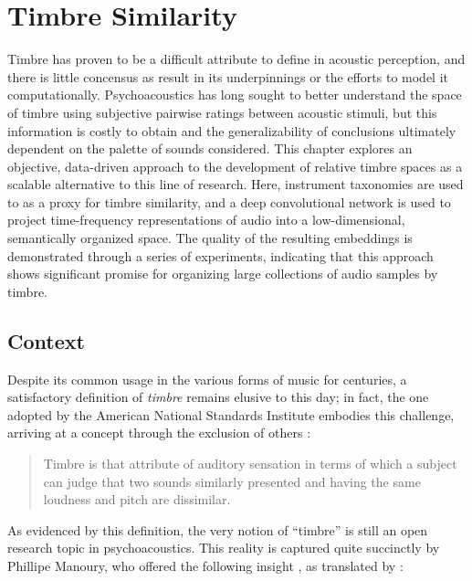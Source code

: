 
\graphicspath{{4/figures/}}

\chapter{Timbre Similarity}
\label{chp:timbre}

Timbre has proven to be a difficult attribute to define in acoustic perception, and there is little concensus as result in its underpinnings or the efforts to model it computationally.
Psychoacoustics has long sought to better understand the space of timbre using subjective pairwise ratings between acoustic stimuli, but this information is costly to obtain and the generalizability of conclusions ultimately dependent on the palette of sounds considered.
This chapter explores an objective, data-driven approach to the development of relative timbre spaces as a scalable alternative to this line of research.
Here, instrument taxonomies are used to as a proxy for timbre similarity, and a deep convolutional network is used to project time-frequency representations of audio into a low-dimensional, semantically organized space.
The quality of the resulting embeddings is demonstrated through a series of experiments, indicating that this approach shows significant promise for organizing large collections of audio samples by timbre.


\section{Context}
\label{sec:context}

Despite its common usage in the various forms of music for centuries, a satisfactory definition of \emph{timbre} remains elusive to this day; in fact, the one adopted by the American National Standards Institute embodies this challenge, arriving at a concept through the exclusion of others \cite{ANSI1973}:

\begin{quote}
Timbre is that attribute of auditory sensation in terms of which a subject can judge that two sounds similarly presented and having the same loudness and pitch are dissimilar.
\end{quote}

As evidenced by this definition, the very notion of ``timbre'' is still an open research topic in psychoacoustics.
This reality is captured quite succinctly by Phillipe Manoury, who offered the following insight \cite{Manoury1991Limites}, as translated by \cite{Donnadieu2007Mental}:

